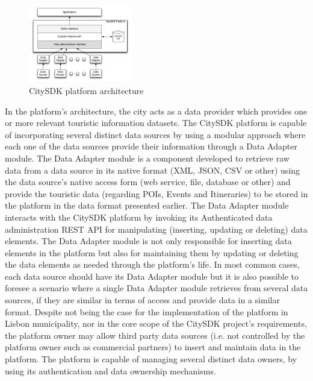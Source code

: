 \documentclass[times,doublespace]{ettauth}%
\begin{document}
\begin{figure}[!ht]
\centering
\includegraphics[width=0.4\textwidth]{images/architecture}
\caption{CitySDK platform architecture}
\label{fig:architecture}
\end{figure}

In the platform's architecture, the city acts as a data provider which provides one or more relevant touristic information datasets. 
The CitySDK platform is capable of incorporating several distinct data sources by using a modular approach where each one of the data sources provide their information through a Data Adapter module. 
The Data Adapter module is a component developed to retrieve raw data from a data source in its native format (XML, JSON, CSV or other) using the data source's native access form (web service, file, database or other) and provide the touristic data (regarding \acp{POI}, Events and Itineraries) to be stored in the platform in the data format presented earlier. 
The Data Adapter module interacts with the CitySDK platform by invoking its Authenticated data administration REST API for manipulating (inserting, updating or deleting) data elements. 
The Data Adapter module is not only responsible for inserting data elements in the platform but also for maintaining them by updating or deleting the data elements as needed through the platform's life. 
In most common cases, each data source should have its Data Adapter module but it is also possible to foresee a scenario where a single Data Adapter module retrieves from several data sources, if they are similar in terms of access and provide data in a similar format. 
Despite not being the case for the implementation of the platform in Lisbon municipality, nor in the core scope of the CitySDK project's requirements, the platform owner may allow third party data sources (i.e. not controlled by the platform owner such as commercial partners) to insert and maintain data in the platform. 
The platform is capable of managing several distinct data owners, by using its authentication and data ownership mechanisms.
\end{document}

